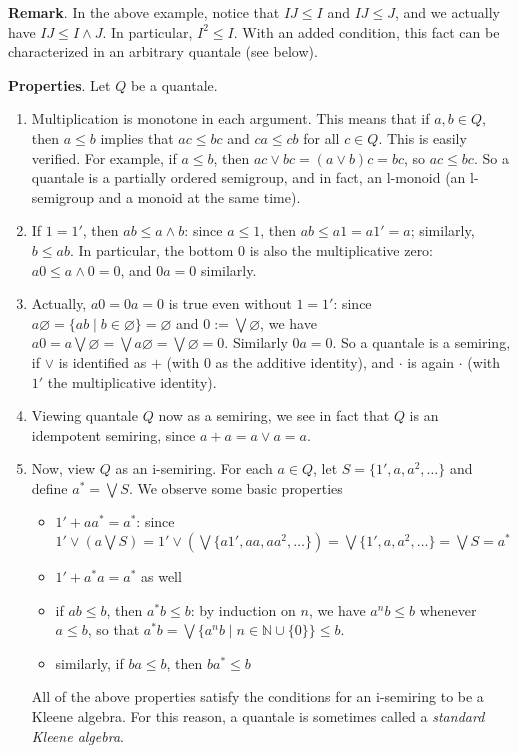 \documentclass[12pt]{article}
\begin{document}
\textbf{Remark}.  In the above example, notice that $IJ\le I$ and $IJ\le J$, and we actually have $IJ\le I\wedge J$.  In particular, $I^2\le I$.  With an added condition, this fact can be characterized in an arbitrary quantale (see below).

\textbf{Properties}.  Let $Q$ be a quantale.
\begin{enumerate}
\item
Multiplication is monotone in each argument.  This means that if $a,b\in Q$, then $a\le b$ implies that $ac\le bc$ and $ca\le cb$ for all $c\in Q$.  This is easily verified.  For example, if $a\le b$, then $ac\vee bc=(a\vee b)c=bc$, so $ac\le bc$.  So a quantale is a partially ordered semigroup, and in fact, an l-monoid (an l-semigroup and a monoid at the same time).
\item
If $1=1'$, then $ab\le a\wedge b$: since $a\le 1$, then $ab\le a1=a1'=a$; similarly, $b\le ab$.  In particular, the bottom $0$ is also the multiplicative zero: $a0\le a\wedge 0=0$, and $0a=0$ similarly.
\item
Actually, $a0=0a=0$ is true even without $1=1'$: since $a\varnothing=\lbrace ab\mid b\in \varnothing\rbrace = \varnothing$ and $0:=\bigvee \varnothing$, we have $a0=a\bigvee \varnothing=\bigvee a\varnothing=\bigvee\varnothing=0$.  Similarly $0a=0$.  So a quantale is a semiring, if $\vee$ is identified as $+$ (with $0$ as the additive identity), and $\cdot$ is again $\cdot$ (with $1'$ the multiplicative identity).
\item
Viewing quantale $Q$ now as a semiring, we see in fact that $Q$ is an idempotent semiring, since $a+a=a\vee a=a$.
\item
Now, view $Q$ as an i-semiring.  For each $a\in Q$, let $S=\lbrace 1',a,a^2,\ldots\rbrace$ and define $a^*=\bigvee S$.  We observe some basic properties
\begin{itemize}
\item $1'+aa^*=a^*$: since $1'\vee (a\bigvee S)=1'\vee (\bigvee \lbrace a1',aa,aa^2,\ldots\rbrace) = \bigvee \lbrace 1',a,a^2,\ldots \rbrace = \bigvee S=a^*$
\item $1'+a^*a=a^*$ as well
\item if $ab\le b$, then $a^*b\le b$: by induction on $n$, we have $a^nb\le b$ whenever $a\le b$, so that $a^*b=\bigvee \lbrace a^nb\mid n\in \mathbb{N}\cup \lbrace 0\rbrace \rbrace \le b$.
\item similarly, if $ba\le b$, then $ba^*\le b$
\end{itemize}
All of the above properties satisfy the conditions for an i-semiring to be a Kleene algebra.  For this reason, a quantale is sometimes called a \emph{standard Kleene algebra}.

\end{enumerate}
\end{document}
